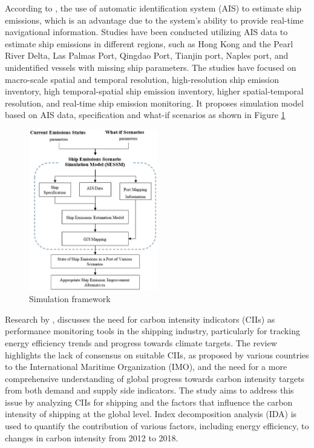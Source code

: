 According to \cite{jmse10020129}, the use of automatic identification system (AIS) to estimate ship emissions, which is an advantage due to the system's ability to provide real-time navigational information.
Studies have been conducted utilizing AIS data to estimate ship emissions in different regions, such as Hong Kong and the Pearl River Delta, Las Palmas Port, Qingdao Port, Tianjin port, Naples port, and unidentified vessels with missing ship parameters.
The studies have focused on macro-scale spatial and temporal resolution, high-resolution ship emission inventory, high temporal-spatial ship emission inventory, higher spatial-temporal resolution, and real-time ship emission monitoring.
It proposes simulation model based on AIS data, specification and what-if scenarios as shown in Figure \ref{simaulationFramework}

\begin{figure}[h]
    \centering
    \includegraphics[width=0.5\textwidth]{images/simulation_framework.jpeg}
    \caption{Simulation framework}
    \label{simaulationFramework}
\end{figure}


Research by \cite{SOU2022113239}, discusses the need for carbon intensity indicators (CIIs) as performance monitoring tools in the shipping industry, particularly for tracking energy efficiency trends and progress towards climate targets.
The review highlights the lack of consensus on suitable CIIs, as proposed by various countries to the International Maritime Organization (IMO), and the need for a more comprehensive understanding of global progress towards carbon intensity targets from both demand and supply side indicators.
The study aims to address this issue by analyzing CIIs for shipping and the factors that influence the carbon intensity of shipping at the global level. Index decomposition analysis (IDA) is used to quantify the contribution of various factors, including energy efficiency, to changes in carbon intensity from 2012 to 2018.




